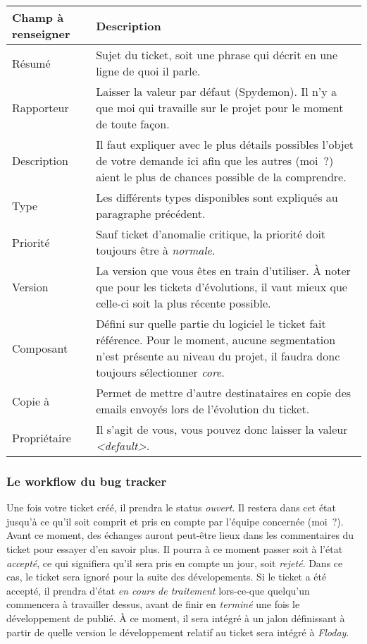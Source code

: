 \begin{longtable}{|p{3cm}|p{10cm}|}
	\hline
	Champ à renseigner & Description\\
	\hline
	Résumé & Sujet du ticket, soit une phrase qui décrit en une ligne de quoi il parle.\\
	Rapporteur & Laisser la valeur par défaut (Spydemon). Il n'y a que moi qui travaille sur le projet pour le moment de toute façon.\\
	Description & Il faut expliquer avec le plus détails possibles l'objet de votre demande ici afin que les autres (moi~?) aient le plus de chances possible de la comprendre.\\
	Type & Les différents types disponibles sont expliqués au paragraphe précédent.\\
	Priorité & Sauf ticket d'anomalie critique, la priorité doit toujours être à \emph{normale}.\\
	Version & La version que vous êtes en train d'utiliser. À noter que pour les tickets d'évolutions, il vaut mieux que celle-ci soit la plus récente possible.\\
	Composant & Défini sur quelle partie du logiciel le ticket fait référence. Pour le moment, aucune segmentation n'est présente au niveau du projet, il faudra donc toujours sélectionner \emph{core}.\\
	Copie à & Permet de mettre d'autre destinataires en copie des emails envoyés lors de l'évolution du ticket.\\
	Propriétaire & Il s'agit de vous, vous pouvez donc laisser la valeur \emph{<default>}.\\
	\hline
\end{longtable}

\subsubsection{Le workflow du bug tracker}

Une fois votre ticket créé, il prendra le status \emph{ouvert}.
Il restera dans cet état jusqu'à ce qu'il soit comprit et pris en compte par l'équipe concernée (moi~?).
Avant ce moment, des échanges auront peut-être lieux dans les commentaires du ticket pour essayer d'en savoir plus.
Il pourra à ce moment passer soit à l'état \emph{accepté}, ce qui signifiera qu'il sera pris en compte un jour, soit \emph{rejeté}.
Dans ce cas, le ticket sera ignoré pour la suite des dévelopements.
Si le ticket a été accepté, il prendra d'état \emph{en cours de traitement} lors-ce-que quelqu'un commencera à travailler dessus, avant de finir en \emph{terminé} une fois le développement de publié.
À ce moment, il sera intégré à un jalon définissant à partir de quelle version le développement relatif au ticket sera intégré à \emph{Floday}.
